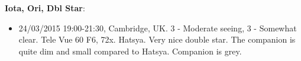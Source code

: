 {\bf Iota, Ori, Dbl Star}:
\begin{itemize}
\item 24/03/2015 19:00-21:30, Cambridge, UK. 3 - Moderate seeing, 3 - Somewhat clear. Tele Vue 60 F6, 72x. Hatsya. Very nice double star. The companion is quite dim and small compared to Hatsya. Companion is grey. 
\end{itemize}
